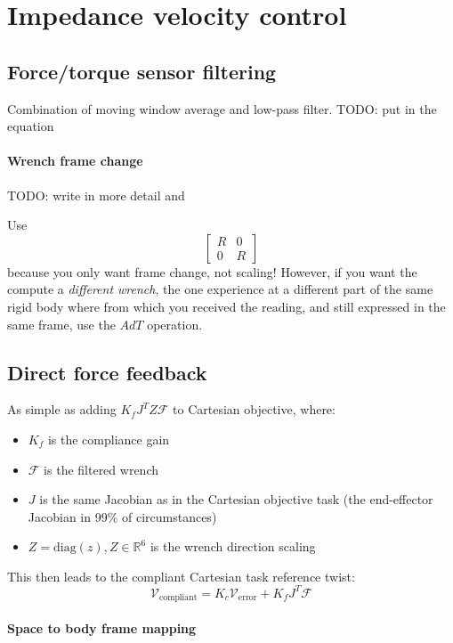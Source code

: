 \section{Impedance velocity control}
\subsection{Force/torque sensor filtering}
Combination of moving window average and low-pass filter.
TODO: put in the equation

\paragraph{Wrench frame change}
TODO: write in more detail and

Use
\begin{equation}
\begin{bmatrix} 
		R & 0 \\
		0 & R
\end{bmatrix} 
\end{equation}
because you only want frame change, not scaling!
However, if you want the compute a \textit{different wrench},
the one experience at a different part of the same rigid body
where from which you received the reading,
and still expressed in the same frame,
use the $ Ad T $ operation.

\subsection{Direct force feedback}
As simple as adding $ K_{ f }J^{ T } Z \mathcal{F}  $ to Cartesian objective,
where:
\begin{itemize}
		\item $ K_{ f }  $ is the compliance gain
		\item $ \mathcal{F}  $ is the filtered wrench
		\item $ J  $ is the same Jacobian as in the Cartesian objective task 
(the end-effector Jacobian in 99\% of circumstances)
\item $ Z = \text{diag} (z), Z \in \mathbb{R}^{6}  $ is the wrench direction scaling
\end{itemize} 
This then leads to the compliant Cartesian task reference twist:
\begin{equation}
\mathcal{V}_{ \text{compliant} } =  K_{ c }\mathcal{V}_{ \text{error} } + 
K_{ f } J^{ T } \mathcal{F}
\end{equation}

\paragraph{Space to body frame mapping}

